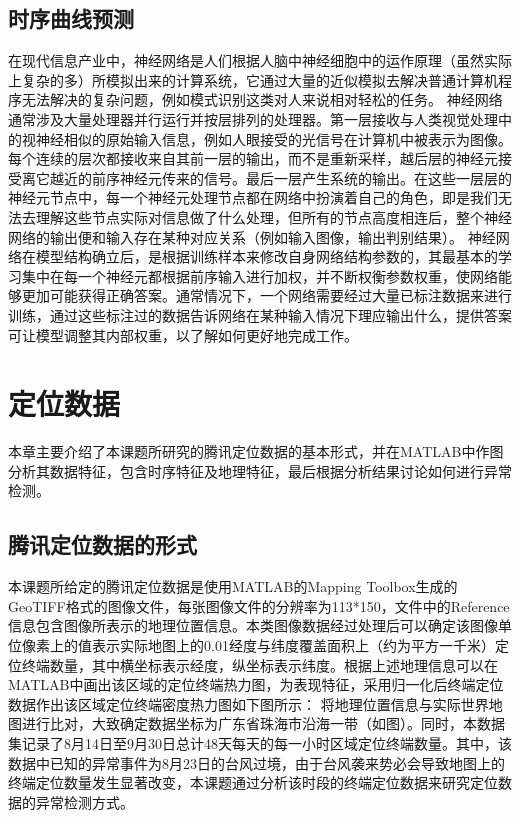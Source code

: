 \documentclass[a4paper,AutoFakeBold,oneside,12pt]{book}
\begin{document}
{{\section{时序曲线预测}
在现代信息产业中，神经网络是人们根据人脑中神经细胞中的运作原理（虽然实际上复杂的多）所模拟出来的计算系统，它通过大量的近似模拟去解决普通计算机程序无法解决的复杂问题，例如模式识别这类对人来说相对轻松的任务。
	神经网络通常涉及大量处理器并行运行并按层排列的处理器。第一层接收与人类视觉处理中的视神经相似的原始输入信息，例如人眼接受的光信号在计算机中被表示为图像。每个连续的层次都接收来自其前一层的输出，而不是重新采样，越后层的神经元接受离它越近的前序神经元传来的信号。最后一层产生系统的输出。在这些一层层的神经元节点中，每一个神经元处理节点都在网络中扮演着自己的角色，即是我们无法去理解这些节点实际对信息做了什么处理，但所有的节点高度相连后，整个神经网络的输出便和输入存在某种对应关系（例如输入图像，输出判别结果）。
	神经网络在模型结构确立后，是根据训练样本来修改自身网络结构参数的，其最基本的学习集中在每一个神经元都根据前序输入进行加权，并不断权衡参数权重，使网络能够更加可能获得正确答案。通常情况下，一个网络需要经过大量已标注数据来进行训练，通过这些标注过的数据告诉网络在某种输入情况下理应输出什么，提供答案可让模型调整其内部权重，以了解如何更好地完成工作。


\chapter{定位数据}
本章主要介绍了本课题所研究的腾讯定位数据的基本形式，并在MATLAB中作图分析其数据特征，包含时序特征及地理特征，最后根据分析结果讨论如何进行异常检测。


\section{腾讯定位数据的形式}
本课题所给定的腾讯定位数据是使用MATLAB的Mapping Toolbox生成的GeoTIFF格式的图像文件，每张图像文件的分辨率为113*150，文件中的Reference信息包含图像所表示的地理位置信息。本类图像数据经过处理后可以确定该图像单位像素上的值表示实际地图上的0.01经度与纬度覆盖面积上（约为平方一千米）定位终端数量，其中横坐标表示经度，纵坐标表示纬度。根据上述地理信息可以在MATLAB中画出该区域的定位终端热力图，为表现特征，采用归一化后终端定位数据作出该区域定位终端密度热力图如下图所示：
	将地理位置信息与实际世界地图进行比对，大致确定数据坐标为广东省珠海市沿海一带（如图）。同时，本数据集记录了8月14日至9月30日总计48天每天的每一小时区域定位终端数量。其中，该数据中已知的异常事件为8月23日的台风过境，由于台风袭来势必会导致地图上的终端定位数量发生显著改变，本课题通过分析该时段的终端定位数据来研究定位数据的异常检测方式。

}}
\end{document}
